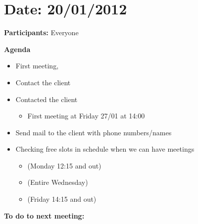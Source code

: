 


\section{Date: 20/01/2012}

\textbf{Participants:} Everyone

\textbf{Agenda} 
\begin{itemize}
\item First meeting, 
\item Contact the client 
\item Contacted the client

\begin{itemize}
\item First meeting at Friday 27/01 at 14:00 
\end{itemize}
\item Send mail to the client with phone numbers/names 
\item Checking free slots in schedule when we can have meetings

\begin{itemize}
\item (Monday 12:15 and out) 
\item (Entire Wednesday) 
\item (Friday 14:15 and out) 
\end{itemize}
\end{itemize}
\textbf{To do to next meeting:}

